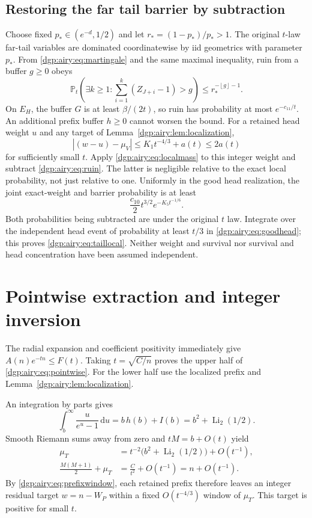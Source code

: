 \documentclass[11pt,letterpaper]{article}
\numberwithin{equation}{section}
\theoremstyle{remark}\newtheorem{remark}[theorem]{Remark}
\newcommand{\PP}{\mathbb P}
\newcommand{\floor}[1]{\left\lfloor #1\right\rfloor}
\newcommand{\dd}{\,\mathrm d}
\begin{document}
\subsection{Restoring the far tail barrier by subtraction}
Choose fixed $p_*\in(e^{-d},1/2)$ and let $r_*=(1-p_*)/p_*>1$.
The original $t$-law far-tail variables are dominated coordinatewise
by iid geometrics with parameter $p_*$. From \eqref{dgp:airy:eq:martingale}
and the same maximal inequality, ruin from a buffer $g\geq0$ obeys
\begin{equation}\label{dgp:airy:eq:ruin}
 \PP_t\!\left(\exists k\geq1:
       \sum_{i=1}^k(Z_{J+i}-1)>g\right)
 \leq r_*^{-\floor g-1}.
\end{equation}
On $E_H$, the buffer $G$ is at least $\beta/(2t)$, so ruin has
probability at most $e^{-c_{11}/t}$. An additional prefix buffer
$h\geq0$ cannot worsen the bound.
For a retained head weight $u$ and any target of
Lemma~\ref{dgp:airy:lem:localization},
\[
 |(w-u)-\mu_V|\leq K_1t^{-4/3}+a(t)\leq2a(t)
\]
for sufficiently small $t$. Apply \eqref{dgp:airy:eq:localmass} to this integer
weight and subtract \eqref{dgp:airy:eq:ruin}. The latter is negligible relative
to the exact local probability, not just relative to one. Uniformly
in the good head realization, the joint exact-weight and barrier
probability is at least
\[
 \frac{c_{10}}2t^{3/2}e^{-K_5t^{-1/6}}.
\]
Both probabilities being subtracted are under the original $t$ law.
Integrate over the independent head event of probability at least
$t/3$ in \eqref{dgp:airy:eq:goodhead}; this proves
\eqref{dgp:airy:eq:taillocal}. Neither weight and survival nor survival and
head concentration have been assumed independent.

\section{Pointwise extraction and integer inversion}\label{dgp:airy:sec:pointwise}
The radial expansion and coefficient positivity immediately give
$A(n)e^{-tn}\leq F(t)$. Taking $t=\sqrt{C/n}$ proves the upper half
of \eqref{dgp:airy:eq:pointwise}. For the lower half use the localized prefix
and Lemma~\ref{dgp:airy:lem:localization}.

An integration by parts gives
\[
 \int_b^\infty\frac{u}{e^u-1}\dd u
 =b\,h(b)+I(b)=b^2+\operatorname{Li}_2(1/2).
\]
Smooth Riemann sums away from zero and $tM=b+O(t)$ yield
\begin{align}
 \mu_T&=t^{-2}\bigl(b^2+\operatorname{Li}_2(1/2)\bigr)+O(t^{-1}),
                                                        \nonumber\\
 \frac{M(M+1)}2+\mu_T&=\frac{C}{t^2}+O(t^{-1})=n+O(t^{-1}).
                                                        \label{dgp:airy:eq:center}
\end{align}
By \eqref{dgp:airy:eq:prefixwindow}, each retained prefix therefore leaves an
integer residual target $w=n-W_P$ within a fixed $O(t^{-4/3})$
window of $\mu_T$. This target is positive for small $t$.
\end{document}
